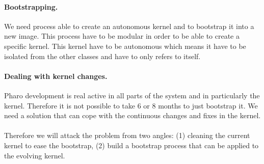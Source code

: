 \paragraph{Bootstrapping.} We need process able to create an autonomous kernel and to bootstrap it into a new image. This process have to be modular in order to be able to create a specific kernel.
This kernel have to be autonomous which means it have to be isolated from the other classes and have to only refers to itself.

\paragraph{Dealing with kernel changes.}
Pharo development is real active in all parts of the system and in particularly the kernel. Therefore it is not possible to take 6 or 8 months to just bootstrap it.
We need a solution that can cope with the continuous changes and fixes in the kernel. 


\paragraph{}Therefore we will attack the problem from two angles: (1) cleaning the current kernel to ease the bootstrap, (2) build a bootstrap process that can be applied to the evolving kernel.